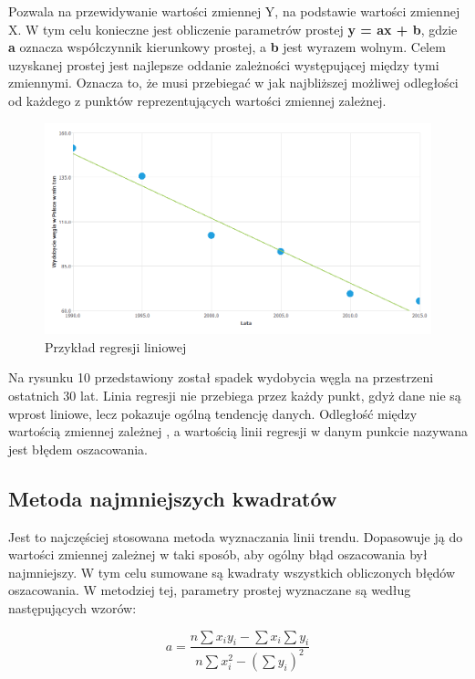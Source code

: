 \documentclass[a4paper,12 pt]{article}
\begin{document}
Pozwala na przewidywanie wartości zmiennej Y, na podstawie wartości zmiennej X. W tym celu konieczne jest obliczenie parametrów prostej \textbf{y = ax + b}, gdzie \textbf{a} oznacza współczynnik kierunkowy prostej, a \textbf{b} jest wyrazem wolnym.
Celem uzyskanej prostej jest najlepsze oddanie zależności występującej między tymi zmiennymi.  Oznacza to, że musi przebiegać w jak najbliższej możliwej odległości od każdego z punktów reprezentujących wartości zmiennej zależnej.


\begin{figure}[h]

\centering
\includegraphics[scale=0.8]{wegiel_regresja.png}
\caption{Przykład regresji liniowej}
\end{figure}
\FloatBarrier


Na rysunku 10 przedstawiony został spadek wydobycia węgla na przestrzeni ostatnich 30 lat. Linia regresji nie przebiega przez każdy punkt, gdyż dane nie są wprost liniowe, lecz pokazuje ogólną tendencję danych. Odległość między wartością zmiennej zależnej , a wartością linii regresji w danym punkcie nazywana jest błędem oszacowania.

\subsection{Metoda najmniejszych kwadratów}
Jest to najczęściej stosowana metoda wyznaczania linii trendu. Dopasowuje ją do wartości zmiennej zależnej w taki sposób, aby ogólny błąd oszacowania był najmniejszy. W tym celu sumowane są kwadraty wszystkich obliczonych błędów oszacowania.
W metodziej tej, parametry prostej wyznaczane są według następujących wzorów:

\begin{mycapequ}[h]

\begin{equation}
a = \frac{n\sum{x_{i}y_{i}} - \sum{x_{i}}\sum{y_{i}}}{n\sum{x_{i}^2} - (\sum{y_{i}})^2}
\end{equation}
\caption{Współczynnik kierunkowy prostej}
\end{mycapequ} 
\FloatBarrier
\end{document}
